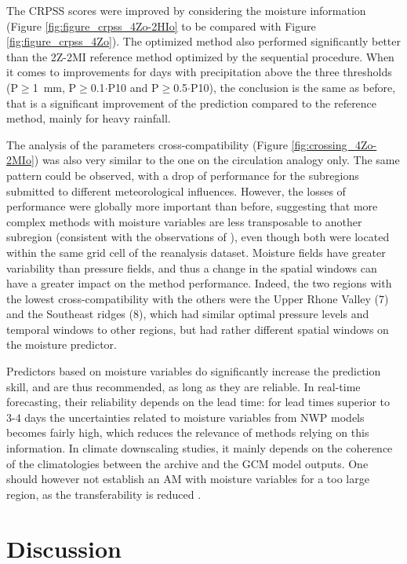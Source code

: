 \documentclass[review]{elsarticle}
\begin{document}
The CRPSS scores were improved by considering the moisture information (Figure \ref{fig:figure_crpss_4Zo-2HIo} to be compared with Figure \ref{fig:figure_crpss_4Zo}). The optimized method also performed significantly better than the 2Z-2MI reference method optimized by the sequential procedure. When it comes to improvements for days with precipitation above the three thresholds (P\(\geq\)1~mm, P\(\geq\)0.1\(\cdot\)P10 and P\(\geq\)0.5\(\cdot\)P10), the conclusion is the same as before, that is a significant improvement of the prediction compared to the reference method, mainly for heavy rainfall.

The analysis of the parameters cross-compatibility (Figure \ref{fig:crossing_4Zo-2MIo}) was also very similar to the one on the circulation analogy only. The same pattern could be observed, with a drop of performance for the subregions submitted to different meteorological influences. However, the losses of performance were globally more important than before, suggesting that more complex methods with moisture variables are less transposable to another subregion (consistent with the observations of \citet{Chardon2014}), even though both were located within the same grid cell of the reanalysis dataset. Moisture fields have greater variability than pressure fields, and thus a change in the spatial windows can have a greater impact on the method performance. Indeed, the two regions with the lowest cross-compatibility with the others were the Upper Rhone Valley (7) and the Southeast ridges (8), which had similar optimal pressure levels and temporal windows to other regions, but had rather different spatial windows on the moisture predictor.

Predictors based on moisture variables do significantly increase the prediction skill, and are thus recommended, as long as they are reliable. In real-time forecasting, their reliability depends on the lead time: for lead times superior to 3-4 days the uncertainties related to moisture variables from NWP models becomes fairly high, which reduces the relevance of methods relying on this information. In climate downscaling studies, it mainly depends on the coherence of the climatologies between the archive and the GCM model outputs. One should however not establish an AM with moisture variables for a too large region, as the transferability is reduced \citep[see][for alternative approaches]{Chardon2014}.


\section{Discussion}
\label{sec:discussion}
\end{document}
